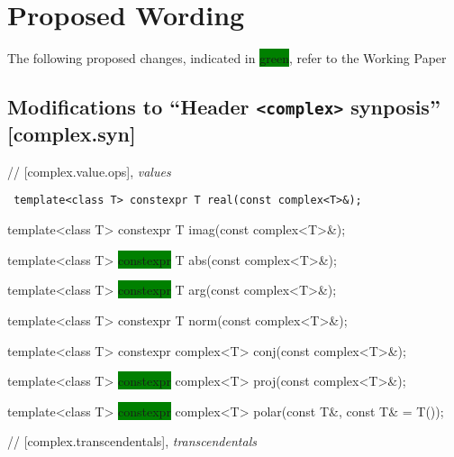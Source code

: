 \documentclass[prd,twocolumn,amsmath,amssymb,nofootinbib,eqsecnum]{revtex4-1}
\newcommand{\code}[1]{{\tt #1}}
\newcommand{\header}[1]{{\tt <#1>}}
\newcommand{\highlight}[1]{\colorbox{green}{\!\!\!\! #1}}
\begin{document}
\newpage

\onecolumngrid

\section{Proposed Wording}

\setlength{\parindent}{0pt}


The following proposed changes, indicated in \highlight{green}, refer to the Working Paper~\cite{WorkingPaper}


\subsection{Modifications to ``Header \header{complex} synposis'' [complex.syn]}

// [complex.value.ops], {\it values }

\vspace{2ex}

\code{
  	template<class T> constexpr T real(const complex<T>\&);
	
  	template<class T> constexpr T imag(const complex<T>\&);

	\vspace{2ex}

	template<class T> \highlight{constexpr} T abs(const complex<T>\&);
 	
	template<class T> \highlight{constexpr} T arg(const complex<T>\&);
	
	template<class T> constexpr T norm(const complex<T>\&);
	
	\vspace{2ex}
	
	template<class T> constexpr complex<T> conj(const complex<T>\&);
	
	template<class T> \highlight{constexpr} complex<T> proj(const complex<T>\&);
	
	template<class T> \highlight{constexpr} complex<T>  polar(const T\&, const T\& = T());	

}

\vspace{2ex}

// [complex.transcendentals], {\it transcendentals}
\end{document}
